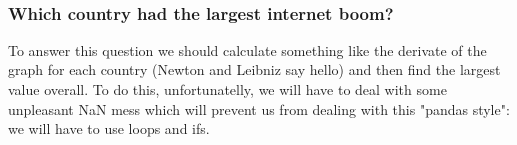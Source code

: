 \documentclass[11pt]{article}
\begin{document}
    \begin{center}
    \end{center}
    { \hspace*{\fill} \\}
    
    \subsubsection{Which country had the largest internet
boom?}\label{which-country-had-the-largest-internet-boom}

    To answer this question we should calculate something like the derivate
of the graph for each country (Newton and Leibniz say hello) and then
find the largest value overall. To do this, unfortunatelly, we will have
to deal with some unpleasant NaN mess which will prevent us from dealing
with this "pandas style": we will have to use loops and ifs.
\end{document}
